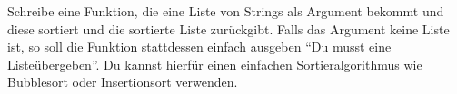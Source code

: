 \begin{aufg}
  Schreibe eine Funktion, die eine Liste von Strings als Argument bekommt und diese sortiert und die sortierte Liste zurückgibt.
  Falls das Argument keine Liste ist, so soll die Funktion stattdessen einfach ausgeben ``Du musst eine Listeübergeben''.
  Du kannst hierfür einen einfachen Sortieralgorithmus wie Bubblesort oder Insertionsort verwenden.
\end{aufg}
